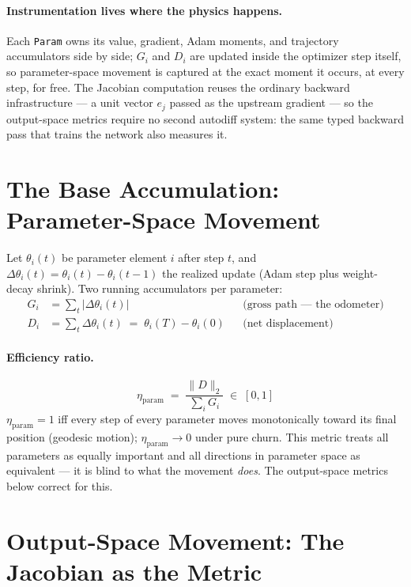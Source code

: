 \documentclass[11pt]{article}
\begin{document}
\paragraph{Instrumentation lives where the physics happens.} Each \texttt{Param} owns its
value, gradient, Adam moments, and trajectory accumulators side by side; $G_i$ and $D_i$ are
updated inside the optimizer step itself, so parameter-space movement is captured at the exact
moment it occurs, at every step, for free. The Jacobian computation reuses the ordinary
backward infrastructure --- a unit vector $e_j$ passed as the upstream gradient --- so the
output-space metrics require no second autodiff system: the same typed backward pass that
trains the network also measures it.

\section{The Base Accumulation: Parameter-Space Movement}

Let $\theta_i(t)$ be parameter element $i$ after step $t$, and
$\Delta\theta_i(t) = \theta_i(t) - \theta_i(t-1)$ the realized update (Adam step
plus weight-decay shrink). Two running accumulators per parameter:
\begin{align}
    G_i &= \sum_t \bigl|\Delta\theta_i(t)\bigr|
        &&\text{(gross path --- the odometer)} \\[2pt]
    D_i &= \sum_t \Delta\theta_i(t) \;=\; \theta_i(T) - \theta_i(0)
        &&\text{(net displacement)}
\end{align}

\paragraph{Efficiency ratio.}
\begin{equation}
    \eta_{\mathrm{param}} \;=\; \frac{\|D\|_2}{\sum_i G_i} \;\in\; [0, 1]
\end{equation}
$\eta_{\mathrm{param}} = 1$ iff every step of every parameter moves monotonically toward its
final position (geodesic motion); $\eta_{\mathrm{param}} \to 0$ under pure churn. This metric
treats all parameters as equally important and all directions in parameter space as
equivalent --- it is blind to what the movement \emph{does}. The output-space metrics below
correct for this.

\section{Output-Space Movement: The Jacobian as the Metric}
\end{document}
